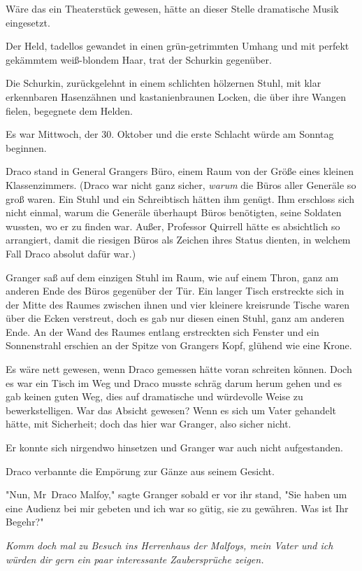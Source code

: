 {Wäre das ein Theaterstück gewesen, hätte an dieser Stelle dramatische Musik eingesetzt.

Der Held, tadellos gewandet in einen grün-getrimmten Umhang und mit perfekt gekämmtem weiß-blondem Haar, trat der Schurkin gegenüber.

Die Schurkin, zurückgelehnt in einem schlichten hölzernen Stuhl, mit klar erkennbaren Hasenzähnen und kastanienbraunen Locken, die über ihre Wangen fielen, begegnete dem Helden.

Es war Mittwoch, der 30. Oktober und die erste Schlacht würde am Sonntag beginnen.

Draco stand in General Grangers Büro, einem Raum von der Größe eines kleinen Klassenzimmers. (Draco war nicht ganz sicher, \emph{warum} die Büros aller Generäle so groß waren. Ein Stuhl und ein Schreibtisch hätten ihm genügt. Ihm erschloss sich nicht einmal, warum die Generäle überhaupt Büros benötigten, seine Soldaten wussten, wo er zu finden war. Außer, Professor Quirrell hätte es absichtlich so arrangiert, damit die riesigen Büros als Zeichen ihres Status dienten, in welchem Fall Draco absolut dafür war.)

Granger saß auf dem einzigen Stuhl im Raum, wie auf einem Thron, ganz am anderen Ende des Büros gegenüber der Tür. Ein langer Tisch erstreckte sich in der Mitte des Raumes zwischen ihnen und vier kleinere kreisrunde Tische waren über die Ecken verstreut, doch es gab nur diesen einen Stuhl, ganz am anderen Ende. An der Wand des Raumes entlang erstreckten sich Fenster und ein Sonnenstrahl erschien an der Spitze von Grangers Kopf, glühend wie eine Krone.

Es wäre nett gewesen, wenn Draco gemessen hätte voran schreiten können. Doch es war ein Tisch im Weg und Draco musste schräg darum herum gehen und es gab keinen guten Weg, dies auf dramatische und würdevolle Weise zu bewerkstelligen. War das Absicht gewesen? Wenn es sich um Vater gehandelt hätte, mit Sicherheit; doch das hier war Granger, also sicher nicht.

Er konnte sich nirgendwo hinsetzen und Granger war auch nicht aufgestanden.

Draco verbannte die Empörung zur Gänze aus seinem Gesicht.

"Nun, Mr~Draco Malfoy," sagte Granger sobald er vor ihr stand, "Sie haben um eine Audienz bei mir gebeten und ich war so gütig, sie zu gewähren. Was ist Ihr Begehr?"

\emph{Komm doch mal} \emph{zu Besuch ins Herrenhaus der Malfoys, mein Vater und ich würden dir gern ein paar interessante Zaubersprüche zeigen.}

}
